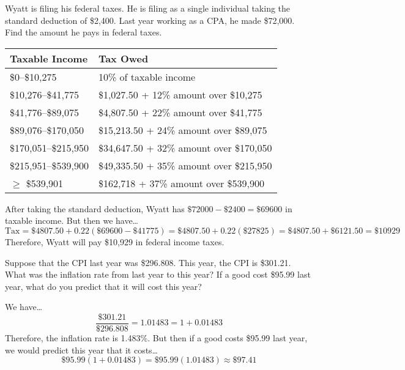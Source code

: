 \documentclass[11pt,letterpaper]{article}
\begin{document}

 Wyatt is filing his federal taxes. He is filing as a single individual taking the standard deduction of \$2,400. Last year working as a CPA, he made \$72,000. Find the amount he pays in federal taxes. 
	\begin{table}[!ht]
	\centering
	\begin{tabular}{|l|l|} \hline
	Taxable Income & Tax Owed \\ \hline \hline
	\$0--\$10,275 & 10\% of taxable income \\ \hline
	\$10,276--\$41,775 & \$1,027.50 + 12\% amount over \$10,275 \\ \hline
	\$41,776--\$89,075 & \$4,807.50 + 22\% amount over \$41,775 \\ \hline
	\$89,076--\$170,050 & \$15,213.50 + 24\% amount over \$89,075 \\ \hline
	\$170,051--\$215,950 & \$34,647.50 + 32\% amount over \$170,050 \\ \hline
	\$215,951--\$539,900 & \$49,335.50 + 35\% amount over \$215,950 \\ \hline
	$\geq$ \$539,901 & \$162,718 + 37\% amount over \$539,900 \\ \hline
	\end{tabular}
	\end{table} \pspace

\sol After taking the standard deduction, Wyatt has $\$72000 - \$2400= \$69600$ in taxable income. But then we have\dots
	\[
	\text{Tax}= \$4807.50 + 0.22(\$69600 - \$41775)= \$4807.50 + 0.22(\$27825)= \$4807.50 + \$6121.50= \$10929
	\]
Therefore, Wyatt will pay \$10,929 in federal income taxes. 



\newpage



 Suppose that the CPI last year was \$296.808. This year, the CPI is \$301.21. What was the inflation rate from last year to this year? If a good cost \$95.99 last year, what do you predict that it will cost this year? \pspace

\sol We have\dots
	\[
	\dfrac{\$301.21}{\$296.808}= 1.01483= 1 + 0.01483
	\] \pspace
Therefore, the inflation rate is 1.483\%. But then if a good costs \$95.99 last year, we would predict this year that it costs\dots
	\[
	\$95.99(1 + 0.01483)= \$95.99(1.01483) \approx \$97.41
	\]
\end{document}
